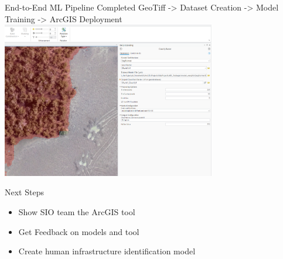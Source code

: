 \begin{frame}{End-to-End ML Pipeline Completed}
    \vspace{1em}
    \centering
    GeoTiff -> Dataset Creation -> Model Training -> ArcGIS Deployment
    \includegraphics[height=0.7\textheight,width=0.7\textwidth,keepaspectratio]{images/arcgis.png}
\end{frame}

\begin{frame}{Next Steps}
    \begin{itemize}
        \item Show SIO team the ArcGIS tool
        \item Get Feedback on models and tool
        \item Create human infrastructure identification model
    \end{itemize}
\end{frame}